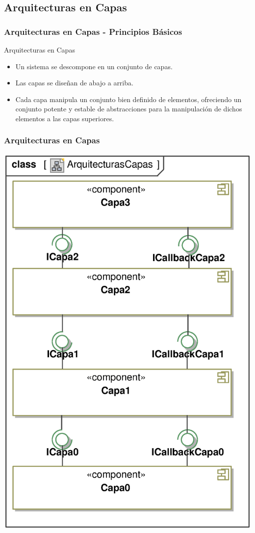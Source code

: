 \documentclass[a4paper,t,xcolor=pst,dvips,colortheme]{beamer}
\begin{document}
\subsection{Arquitecturas en Capas}

\begin{frame}[c]
    \frametitle{Arquitecturas en Capas - Principios Básicos}
    \begin{block}{Arquitecturas en Capas}
        \begin{itemize}[<+->]
            \item Un sistema se descompone en un conjunto de capas.
            \item Las capas se diseñan de abajo a arriba.
            \item Cada capa manipula un conjunto bien definido de elementos, ofreciendo un \alert{conjunto potente y estable de abstracciones} para la manipulación de dichos elementos a las capas superiores.
        \end{itemize}
    \end{block}
\end{frame}

\begin{frame}[c]
	\frametitle{Arquitecturas en Capas}
	\begin{center}
        \includegraphics[width=.40\linewidth,keepaspectratio=true]{images/patterns/layered00.eps}
	\end{center}
\end{frame}
\end{document}
